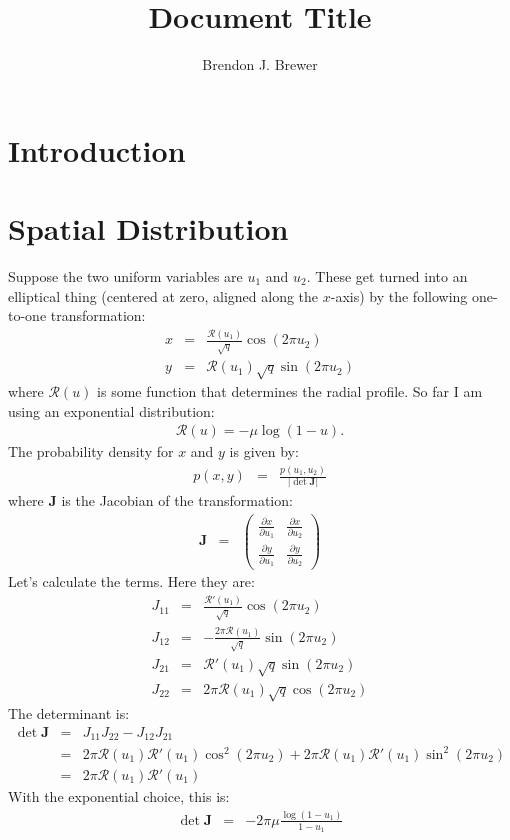 \documentclass[letterpaper, 11pt]{article}
\title{Document Title}
\author{Brendon J. Brewer}
\begin{document}
\maketitle

\section{Introduction}

\section{Spatial Distribution}
Suppose the two uniform variables are $u_1$ and $u_2$.
These get turned into an elliptical thing 
(centered at zero, aligned along the $x$-axis)
by the following one-to-one transformation:
\begin{eqnarray}
x &=& \frac{\mathcal{R}(u_1)}{\sqrt{q}}\cos\left(2\pi u_2\right)\\
y &=& \mathcal{R}(u_1)\sqrt{q}\sin\left(2\pi u_2\right)
\end{eqnarray}
where $\mathcal{R}(u)$ is some function that determines the
radial profile. So far I am using an exponential distribution:
\begin{eqnarray}
\mathcal{R}(u) = -\mu\log(1 - u).
\end{eqnarray}
The probability density for $x$ and $y$ is given by:
\begin{eqnarray}
p(x, y)
&=& \frac{p(u_1, u_2)}{\left|\det \mathbf{J}\right|}
\end{eqnarray}
where $\mathbf{J}$ is the Jacobian of the transformation:
\begin{eqnarray}
\mathbf{J} &=&
\left(
\begin{array}{cc}
\frac{\partial x}{\partial u_1} & \frac{\partial x}{\partial u_2}\\
\frac{\partial y}{\partial u_1} & \frac{\partial y}{\partial u_2}
\end{array}
\right)
\end{eqnarray}
Let's calculate the terms. Here they are:
\begin{eqnarray}
J_{11} &=& \frac{\mathcal{R}'(u_1)}{\sqrt{q}}\cos\left(2\pi u_2\right)\\
J_{12} &=& -\frac{2\pi\mathcal{R}(u_1)}{\sqrt{q}}\sin\left(2\pi u_2\right)\\
J_{21} &=& \mathcal{R}'(u_1)\sqrt{q}\sin\left(2\pi u_2\right)\\
J_{22} &=&  2\pi\mathcal{R}(u_1)\sqrt{q}\cos\left(2\pi u_2\right)
\end{eqnarray}
The determinant is:
\begin{eqnarray}
\det \mathbf{J} &=& J_{11}J_{22} - J_{12}J_{21}\\
&=& 2\pi\mathcal{R}(u_1)\mathcal{R}'(u_1)\cos^2\left(2\pi u_2\right)
+2\pi\mathcal{R}(u_1)\mathcal{R}'(u_1)\sin^2\left(2\pi u_2\right)\\
&=& 2\pi\mathcal{R}(u_1)\mathcal{R}'(u_1)
\end{eqnarray}
With the exponential choice, this is:
\begin{eqnarray}
\det \mathbf{J} &=& -2\pi\mu\frac{\log(1 - u_1)}{1 - u_1}
\end{eqnarray}
\end{document}
